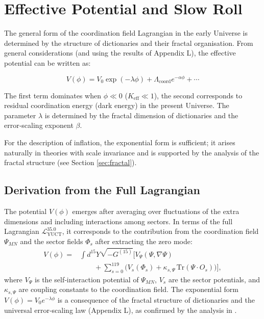 \documentclass[12pt]{article}
\theoremstyle{remark}
\newcommand{\Keff}{K_{\mathrm{eff}}}
\begin{document}
	\section{Effective Potential and Slow Roll}
	\label{sec:potential}
	
	The general form of the coordination field Lagrangian in the early Universe is determined by the structure of dictionaries and their fractal organisation. From general considerations (and using the results of Appendix L), the effective potential can be written as:
	
	\begin{equation}
		V(\phi) = V_0 \exp\left( -\lambda \phi \right) + \Lambda_{\mathrm{coord}} e^{-\alpha \phi} + \cdots
		\label{eq:potential}
	\end{equation}
	
	The first term dominates when $\phi \ll 0$ ($\Keff \ll 1$), the second corresponds to residual coordination energy (dark energy) in the present Universe. The parameter $\lambda$ is determined by the fractal dimension of dictionaries and the error‑scaling exponent $\beta$.
	
	For the description of inflation, the exponential form is sufficient; it arises naturally in theories with scale invariance and is supported by the analysis of the fractal structure (see Section \ref{sec:fractal}).
	
	\subsection{Derivation from the Full Lagrangian}
	
	The potential $V(\phi)$ emerges after averaging over fluctuations of the extra dimensions and including interactions among sectors. In terms of the full Lagrangian $\mathcal{L}_{\text{YUCT}}^{35.0}$, it corresponds to the contribution from the coordination field $\Psi_{MN}$ and the sector fields $\Phi_s$ after extracting the zero mode:
	\begin{align}
		V(\phi) = &\int d^{15}Y \sqrt{-G^{(15)}} \Big[ V_{\Psi}(\Psi,\nabla\Psi) \nonumber\\
		&\qquad + \sum_{s=0}^{119} \big( V_s(\Phi_s) + \kappa_{s,\Psi}\,\mathrm{Tr}(\Psi\cdot O_s) \big) \Big],
	\end{align}
	where $V_{\Psi}$ is the self‑interaction potential of $\Psi_{MN}$, $V_s$ are the sector potentials, and $\kappa_{s,\Psi}$ are coupling constants to the coordination field. The exponential form $V(\phi)=V_0 e^{-\lambda\phi}$ is a consequence of the fractal structure of dictionaries and the universal error‑scaling law (Appendix L), as confirmed by the analysis in \cite{Yakushev2026}.
	
\end{document}
